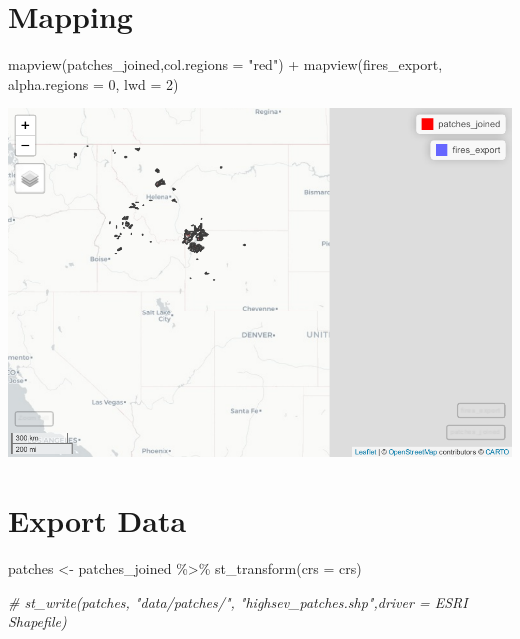 \documentclass[
]{book}
\newenvironment{Shaded}{\begin{snugshade}}{\end{snugshade}}
\newcommand{\AttributeTok}[1]{\textcolor[rgb]{0.77,0.63,0.00}{#1}}
\newcommand{\CommentTok}[1]{\textcolor[rgb]{0.56,0.35,0.01}{\textit{#1}}}
\newcommand{\DecValTok}[1]{\textcolor[rgb]{0.00,0.00,0.81}{#1}}
\newcommand{\FunctionTok}[1]{\textcolor[rgb]{0.00,0.00,0.00}{#1}}
\newcommand{\NormalTok}[1]{#1}
\newcommand{\OtherTok}[1]{\textcolor[rgb]{0.56,0.35,0.01}{#1}}
\newcommand{\SpecialCharTok}[1]{\textcolor[rgb]{0.00,0.00,0.00}{#1}}
\newcommand{\StringTok}[1]{\textcolor[rgb]{0.31,0.60,0.02}{#1}}
\begin{document}
\hypertarget{mapping-1}{%
\section{Mapping}\label{mapping-1}}

\begin{Shaded}
\begin{Highlighting}[]
\FunctionTok{mapview}\NormalTok{(patches\_joined,}\AttributeTok{col.regions =} \StringTok{"red"}\NormalTok{) }\SpecialCharTok{+} \FunctionTok{mapview}\NormalTok{(fires\_export, }\AttributeTok{alpha.regions =} \DecValTok{0}\NormalTok{, }\AttributeTok{lwd =} \DecValTok{2}\NormalTok{)}
\end{Highlighting}
\end{Shaded}

\includegraphics{_main_files/figure-latex/map-1.pdf}

\hypertarget{export-data-1}{%
\section{Export Data}\label{export-data-1}}

\begin{Shaded}
\begin{Highlighting}[]
\NormalTok{patches }\OtherTok{\textless{}{-}}\NormalTok{ patches\_joined }\SpecialCharTok{\%\textgreater{}\%}
  \FunctionTok{st\_transform}\NormalTok{(}\AttributeTok{crs =}\NormalTok{ crs)}

\CommentTok{\# st\_write(patches, "data/patches/", "highsev\_patches.shp",driver = \textquotesingle{}ESRI Shapefile\textquotesingle{})}
\end{Highlighting}
\end{Shaded}
\end{document}
